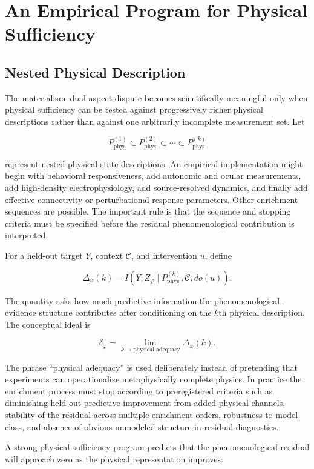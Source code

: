 \chapter{An Empirical Program for Physical Sufficiency}

\section{Nested Physical Description}

The materialism--dual-aspect dispute becomes scientifically meaningful only when physical sufficiency can be tested against progressively richer physical descriptions rather than against one arbitrarily incomplete measurement set. Let

\[
P_{\mathrm{phys}}^{(1)}\subset P_{\mathrm{phys}}^{(2)}\subset\cdots\subset P_{\mathrm{phys}}^{(k)}
\]

represent nested physical state descriptions. An empirical implementation might begin with behavioral responsiveness, add autonomic and ocular measurements, add high-density electrophysiology, add source-resolved dynamics, and finally add effective-connectivity or perturbational-response parameters. Other enrichment sequences are possible. The important rule is that the sequence and stopping criteria must be specified before the residual phenomenological contribution is interpreted.

For a held-out target $Y$, context $\mathcal C$, and intervention $u$, define

\[
\Delta_\varphi(k)=I\!\left(Y;Z_\varphi\mid P_{\mathrm{phys}}^{(k)},\mathcal C,do(u)\right).
\]

The quantity asks how much predictive information the phenomenological-evidence structure contributes after conditioning on the $k$th physical description. The conceptual ideal is

\[
\delta_\varphi=\lim_{k\to \text{physical adequacy}}\Delta_\varphi(k).
\]

The phrase ``physical adequacy'' is used deliberately instead of pretending that experiments can operationalize metaphysically complete physics. In practice the enrichment process must stop according to preregistered criteria such as diminishing held-out predictive improvement from added physical channels, stability of the residual across multiple enrichment orders, robustness to model class, and absence of obvious unmodeled structure in residual diagnostics.

A strong physical-sufficiency program predicts that the phenomenological residual will approach zero as the physical representation improves:

